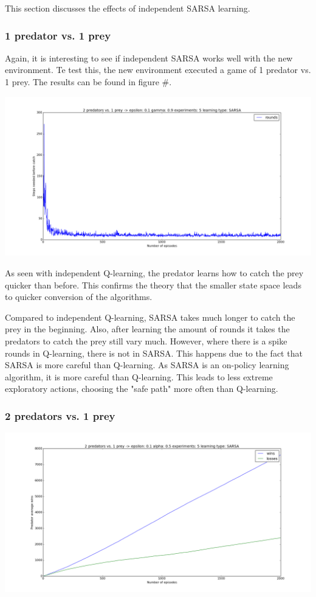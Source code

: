 This section discusses the effects of independent SARSA learning.
\subsubsection{1 predator vs. 1 prey}
Again, it is interesting to see if independent SARSA works well with the new environment. Te test this, the new environment executed a game of 1 predator vs. 1 prey. The results can be found in figure \#.

\begin{center}
	\includegraphics[scale=0.3]{1_predator_1_prey_SARSA}
\end{center}

As seen with independent Q-learning, the predator learns how to catch the prey quicker than before. This confirms the theory that the smaller state space leads to quicker conversion of the algorithms. 

Compared to independent Q-learning, SARSA takes much longer to catch the prey in the beginning. Also, after learning the amount of rounds it takes the predators to catch the prey still vary much. However, where there is a spike rounds in Q-learning, there is not in SARSA. This happens due to the fact that SARSA is more careful than Q-learning. As SARSA is an on-policy learning algorithm, it is more careful than Q-learning. This leads to less extreme exploratory actions, choosing the "safe path" more often than Q-learning.

\subsubsection{2 predators vs. 1 prey}
\begin{center}
	\includegraphics[scale=0.3]{2_predators_SARSA}
\end{center}

